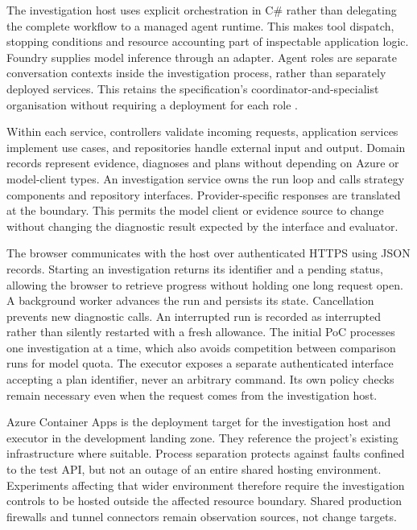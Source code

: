 The investigation host uses explicit orchestration in C\# rather than
delegating the complete workflow to a managed agent runtime. This makes
tool dispatch, stopping conditions and resource accounting part of
inspectable application logic. Foundry supplies model inference through
an adapter. Agent roles are separate conversation contexts inside the
investigation process, rather than separately deployed services. This
retains the specification's coordinator-and-specialist organisation
without requiring a deployment for each role
\parencite[Architecture Sketch]{norlys_operations_agents}.

Within each service, controllers validate incoming requests, application
services implement use cases, and repositories handle external input and
output. Domain records represent evidence, diagnoses and plans without
depending on Azure or model-client types. An investigation service owns
the run loop and calls strategy components and repository interfaces.
Provider-specific responses are translated at the boundary. This permits
the model client or evidence source to change without changing the
diagnostic result expected by the interface and evaluator.

The browser communicates with the host over authenticated HTTPS using
JSON records. Starting an investigation returns its identifier and a
pending status, allowing the browser to retrieve progress without holding
one long request open. A background worker advances the run and persists
its state. Cancellation prevents new diagnostic calls. An interrupted run
is recorded as interrupted rather than silently restarted with a fresh
allowance. The initial PoC processes one investigation at a time, which
also avoids competition between comparison runs for model quota. The
executor exposes a separate authenticated interface accepting a plan
identifier, never an arbitrary command. Its own policy checks remain
necessary even when the request comes from the investigation host.

Azure Container Apps is the deployment target for the investigation host
and executor in the development landing zone. They reference the project's
existing infrastructure where suitable. Process separation protects
against faults confined to the test API, but not an outage of an entire
shared hosting environment. Experiments affecting that wider environment
therefore require the investigation controls to be hosted outside the
affected resource boundary. Shared production firewalls and tunnel
connectors remain observation sources, not change targets.

